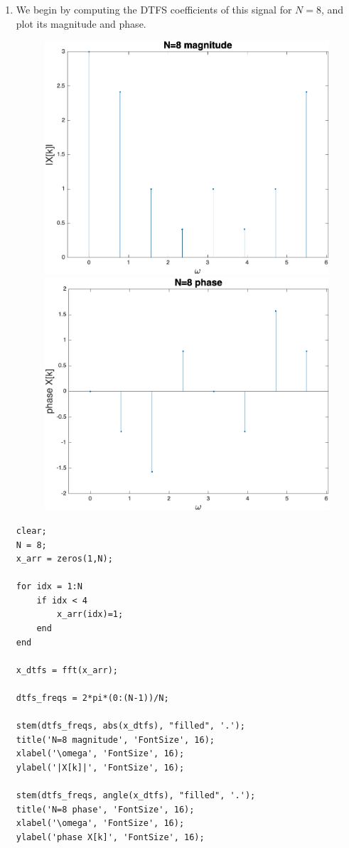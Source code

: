 \documentclass[12pt]{article}
\begin{document}
\begin{enumerate}[label=\textbf{\alph*)}, leftmargin=2.6em]

\item We begin by computing the DTFS coefficients of this signal for $N=8$, and plot its magnitude and phase.

\begin{figure} [H]
    \centering
    \includegraphics[width=0.4\linewidth]{1.png}
    \includegraphics[width=0.4\linewidth]{2.png}
\end{figure}

\begin{verbatim}
clear;
N = 8;
x_arr = zeros(1,N);

for idx = 1:N
    if idx < 4
        x_arr(idx)=1;
    end
end

x_dtfs = fft(x_arr);

dtfs_freqs = 2*pi*(0:(N-1))/N;

stem(dtfs_freqs, abs(x_dtfs), "filled", '.');
title('N=8 magnitude', 'FontSize', 16);
xlabel('\omega', 'FontSize', 16);
ylabel('|X[k]|', 'FontSize', 16);

stem(dtfs_freqs, angle(x_dtfs), "filled", '.');
title('N=8 phase', 'FontSize', 16);
xlabel('\omega', 'FontSize', 16);
ylabel('phase X[k]', 'FontSize', 16);
\end{verbatim}


\end{enumerate}
\end{document}
